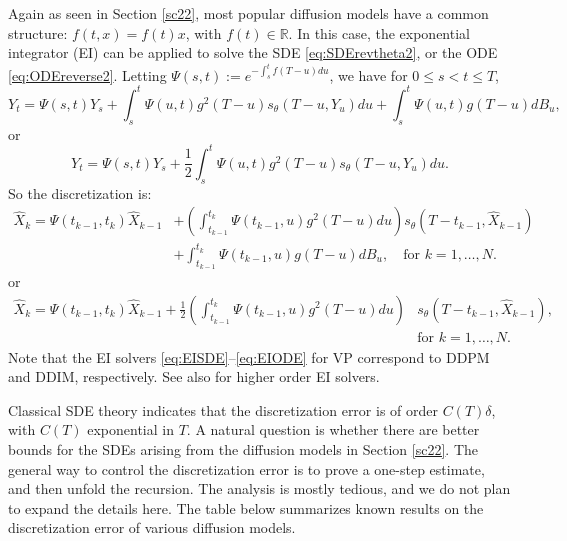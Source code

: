 \documentclass[letterpaper,11pt,reqno]{amsart}
\numberwithin{equation}{section}
\begin{document}
\quad Again as seen in Section \ref{sc22},
most popular diffusion models have a common structure: 
$f(t,x) = f(t)x$, with $f(t) \in \mathbb{R}$.
In this case, the exponential integrator (EI) \cite{ZC23} can be applied to solve 
the SDE \eqref{eq:SDErevtheta2}, or the ODE \eqref{eq:ODEreverse2}.
Letting $\Psi(s,t):=e^{-\int_s^t f(T-u)du}$, we have for $0 \le s < t \le T$,
\begin{equation}
Y_t = \Psi(s,t) Y_s + \int_s^t \Psi(u,t) g^2(T-u) s_{\theta}(T-u, Y_u) du + \int_s^t \Psi(u,t) g(T-u) dB_u, \tag{25'}
\end{equation}
or
\begin{equation}
Y_t = \Psi(s,t) Y_s + \frac{1}{2}\int_s^t \Psi(u,t) g^2(T-u) s_{\theta}(T-u, Y_u) du. \tag{45'}
\end{equation}
So the discretization is:
\begin{equation}
\label{eq:EISDE}
\begin{aligned}
\widehat{X}_k = \Psi(t_{k-1}, t_k) \widehat{X}_{k-1} & + \left(\int_{t_{k-1}}^{t_k} \Psi(t_{k-1}, u) g^2(T -u) du\right) s_{\theta}(T-t_{k-1}, \widehat{X}_{k-1}) \\
&+ \int_{t_{k-1}}^{t_k}\Psi(t_{k-1}, u) g(T - u) dB_u, \quad \mbox{for } k = 1, \ldots, N.
\end{aligned}
\end{equation}
or
\begin{equation}
\label{eq:EIODE}
\begin{aligned}
\widehat{X}_k = \Psi(t_{k-1}, t_k) \widehat{X}_{k-1} + \frac{1}{2} \left(\int_{t_{k-1}}^{t_k} \Psi(t_{k-1}, u) g^2(T -u) du \right) & s_{\theta}(T-t_{k-1}, \widehat{X}_{k-1}), \\
& \mbox{for } k = 1,\ldots, N.
\end{aligned}
\end{equation}
Note that the EI solvers \eqref{eq:EISDE}--\eqref{eq:EIODE} for VP
correspond to DDPM and DDIM, respectively.
See also \cite{WCW24, ZSC23} for higher order EI solvers.

\quad Classical SDE theory \cite{KP92}
indicates that the discretization error is of 
order $C(T) \delta$, with $C(T)$ exponential in $T$.
A natural question is whether there are better bounds 
for the SDEs arising from the diffusion models in Section \ref{sc22}.
The general way to control the discretization error is to
prove a one-step estimate, and then unfold the recursion.
The analysis is mostly tedious,
and we do not plan to expand the details here.
The table below summarizes known results 
on the discretization error of various diffusion models.
\end{document}
